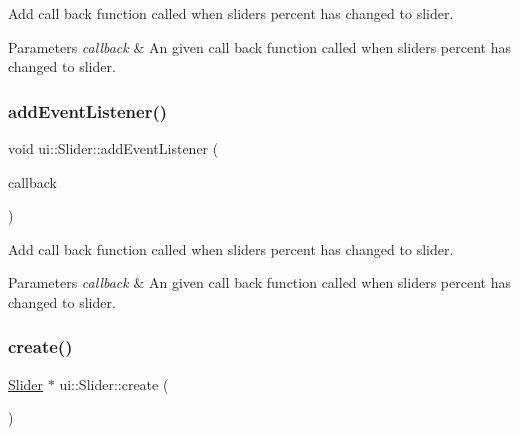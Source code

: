 Add call back function called when slider\textquotesingle{}s percent has changed to slider.


\begin{DoxyParams}{Parameters}
{\em callback} & An given call back function called when slider\textquotesingle{}s percent has changed to slider. \\
\hline
\end{DoxyParams}
\mbox{\label{classui_1_1Slider_af03961eee2f27eb9f96a090fb860220f}} 
\subsubsection{\texorpdfstring{add\+Event\+Listener()}{addEventListener()}\hspace{0.1cm}{\footnotesize\ttfamily [2/2]}}
{\footnotesize\ttfamily void ui\+::\+Slider\+::add\+Event\+Listener (\begin{DoxyParamCaption}\item[{const cc\+Slider\+Callback \&}]{callback }\end{DoxyParamCaption})}

Add call back function called when slider\textquotesingle{}s percent has changed to slider.


\begin{DoxyParams}{Parameters}
{\em callback} & An given call back function called when slider\textquotesingle{}s percent has changed to slider. \\
\hline
\end{DoxyParams}
\mbox{\label{classui_1_1Slider_ad72d0510636270071bb9ada11daebd8a}} 
\subsubsection{\texorpdfstring{create()}{create()}\hspace{0.1cm}{\footnotesize\ttfamily [1/4]}}
{\footnotesize\ttfamily \hyperlink{classui_1_1Slider}{Slider} $\ast$ ui\+::\+Slider\+::create (\begin{DoxyParamCaption}\item[{void}]{ }\end{DoxyParamCaption})\hspace{0.3cm}{\ttfamily [static]}}

